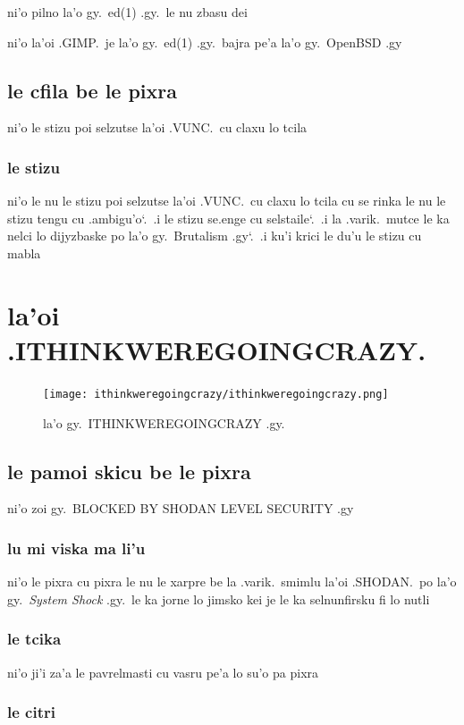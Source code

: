 \documentclass{report}
\newcommand\sds{\spacefactor\sfcode`.\ \space}
\begin{document}
ni'o pilno la'o gy.\ ed(1) .gy.\ le nu zbasu dei

ni'o la'oi .GIMP.\ je la'o gy.\ ed(1) .gy.\ bajra pe'a la'o gy.\ OpenBSD .gy

\section{le cfila be le pixra}
ni'o le stizu poi selzutse la'oi .VUNC.\ cu claxu lo tcila

\subsection{le stizu}
ni'o le nu le stizu poi selzutse la'oi .VUNC.\ cu claxu lo tcila cu se rinka le nu le stizu tengu cu .ambigu'o\sds  .i le stizu se.enge cu selstaile\sds  .i la .varik.\ mutce le ka nelci lo dijyzbaske po la'o gy.\ Brutalism .gy\sds  .i ku'i krici le du'u le stizu cu mabla

\chapter{la'oi .ITHINKWEREGOINGCRAZY.}
\begin{figure}[ht]
	\centering
	\texttt{[image: ithinkweregoingcrazy/ithinkweregoingcrazy.png]}
	\caption[center]{la'o gy.\ ITHINKWEREGOINGCRAZY .gy.}
\end{figure}
\section{le pamoi skicu be le pixra}
ni'o zoi gy.\ BLOCKED BY SHODAN LEVEL SECURITY .gy

\subsection{lu mi viska ma li'u}
ni'o le pixra cu pixra le nu le xarpre be la .varik.\ smimlu la'oi .SHODAN.\ po la'o gy.\ \textit{System Shock} .gy.\ le ka jorne lo jimsko kei je le ka selnunfirsku fi lo nutli

\subsection{le tcika}
ni'o ji'i za'a le pavrelmasti cu vasru pe'a lo su'o pa pixra

\subsection{le citri}
\end{document}
